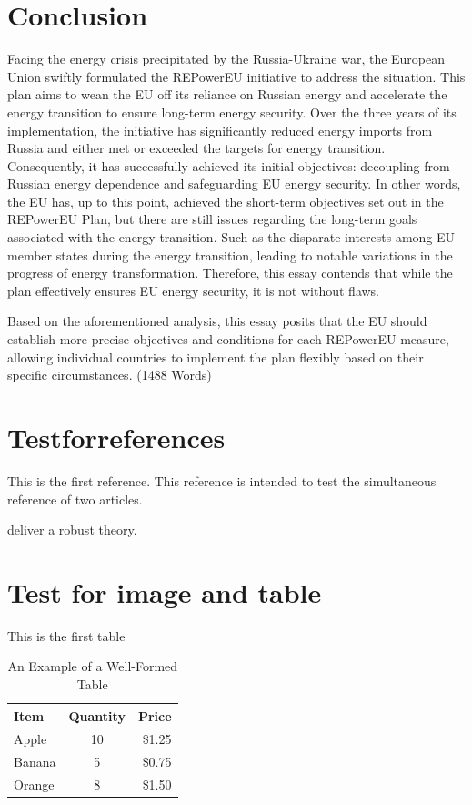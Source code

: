 \documentclass[12pt,a4paper]{article}
\begin{document}
\section{Conclusion}
Facing the energy crisis precipitated by the Russia-Ukraine war, the European Union swiftly formulated the REPowerEU initiative to address the situation. This plan aims to wean the EU off its reliance 
on Russian energy and accelerate the energy transition to ensure long-term energy security. Over the three years of its implementation, the initiative has significantly reduced energy imports from 
Russia and either met or exceeded the targets for energy transition. Consequently, it has successfully achieved its initial objectives: decoupling from Russian energy dependence and safeguarding EU 
energy security. In other words, the EU has, up to this point, achieved the short-term objectives set out in the REPowerEU Plan, but there are still issues regarding the long-term goals associated 
with the energy transition. Such as the disparate interests among EU member states during the energy transition, leading to notable variations in the progress of energy transformation. Therefore, 
this essay contends that while the plan effectively ensures EU energy security, it is not without flaws.

Based on the aforementioned analysis, this essay posits that the EU should establish more precise objectives and conditions for each REPowerEU measure, allowing individual countries to implement the 
plan flexibly based on their specific circumstances. (1488 Words)

\section{Testforreferences}
This is the first reference\parencite{andrikogiannopoulou_reassessing_2019}. This reference is intended to test the simultaneous reference of two articles\parencite{barras_false_nodate,lee_boosting_2024}.

\textcite{wang_robust_2024} deliver a robust theory.

\section{Test for image and table}

This is the first table %
\begin{table}[htbp] %
\centering %
\caption{An Example of a Well-Formed Table} %
\label{tab:tab 1} %
\begin{tabular*}{\textwidth}{@{\extracolsep{\fill}} lcr @{}} %
\toprule
Item & Quantity & Price \\
\midrule
Apple & 10 & \$1.25 \\
Banana & 5 & \$0.75 \\
Orange & 8 & \$1.50 \\
\bottomrule
\end{tabular*}
\end{table}
\end{document}
